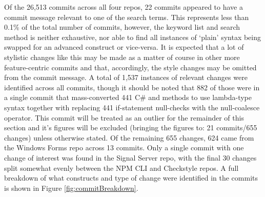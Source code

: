 \documentclass{article}
\begin{document}
        Of the 26,513 commits across all four repos, 22 commits appeared to have a commit message relevant to one of the search terms. This represents less than 0.1\% of the total number of commits, however, the keyword list and search method is neither exhaustive, nor able to find all instances of `plain' syntax being swapped for an advanced construct or vice-versa. It is expected that a lot of stylistic changes like this may be made as a matter of course in other more feature-centric commits and that, accordingly, the style changes may be omitted from the commit message. A total of 1,537 instances of relevant changes were identified across all commits, though it should be noted that 882 of those were in a single commit that mass-converted 441 C\#  and  methods to use lambda-type syntax together with replacing 441 if-statement null-checks with the null-coalesce operator. This commit will be treated as an outlier for the remainder of this section and it's figures will be excluded (bringing the figures to: 21 commits/655 changes) unless otherwise stated. Of the remaining 655 changes, 624 came from the Windows Forms repo across 13 commits. Only a single commit with one change of interest was found in the Signal Server repo, with the final 30 changes split somewhat evenly between the NPM CLI and Checkstyle repos. A full breakdown of what constructs and type of change were identified in the commits is shown in Figure \ref{fig:commitBreakdown}.
\end{document}
